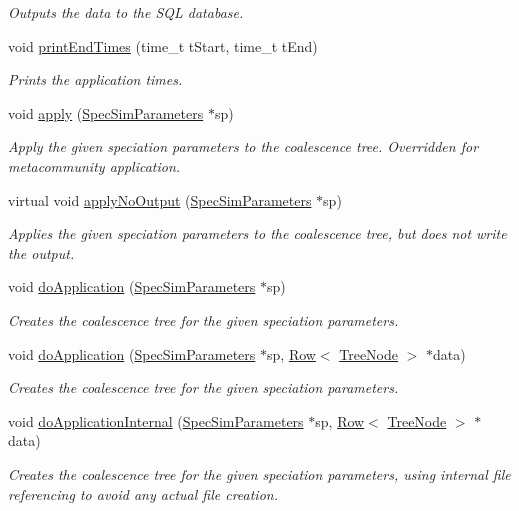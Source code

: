 \begin{DoxyCompactItemize}
\begin{DoxyCompactList}\small\item\em Outputs the data to the S\+QL database. \end{DoxyCompactList}\item 
void \hyperlink{class_community_a36216913433e3e011ee2420e83e1fe4a}{print\+End\+Times} (time\+\_\+t t\+Start, time\+\_\+t t\+End)
\begin{DoxyCompactList}\small\item\em Prints the application times. \end{DoxyCompactList}\item 
void \hyperlink{class_community_ac1dee14af27a0add712e257e316cadbf}{apply} (\hyperlink{struct_spec_sim_parameters}{Spec\+Sim\+Parameters} $\ast$sp)
\begin{DoxyCompactList}\small\item\em Apply the given speciation parameters to the coalescence tree. Overridden for metacommunity application. \end{DoxyCompactList}\item 
virtual void \hyperlink{class_community_ada966cf133c12d0cbabcd77784c951bb}{apply\+No\+Output} (\hyperlink{struct_spec_sim_parameters}{Spec\+Sim\+Parameters} $\ast$sp)
\begin{DoxyCompactList}\small\item\em Applies the given speciation parameters to the coalescence tree, but does not write the output. \end{DoxyCompactList}\item 
void \hyperlink{class_community_a8ce443a30731d2249852d2b615f4a29a}{do\+Application} (\hyperlink{struct_spec_sim_parameters}{Spec\+Sim\+Parameters} $\ast$sp)
\begin{DoxyCompactList}\small\item\em Creates the coalescence tree for the given speciation parameters. \end{DoxyCompactList}\item 
void \hyperlink{class_community_a7289dd39ee9b69ca314e1752a7b45701}{do\+Application} (\hyperlink{struct_spec_sim_parameters}{Spec\+Sim\+Parameters} $\ast$sp, \hyperlink{class_row}{Row}$<$ \hyperlink{class_tree_node}{Tree\+Node} $>$ $\ast$data)
\begin{DoxyCompactList}\small\item\em Creates the coalescence tree for the given speciation parameters. \end{DoxyCompactList}\item 
void \hyperlink{class_community_aee7488d02cccb897ed1d561e242391df}{do\+Application\+Internal} (\hyperlink{struct_spec_sim_parameters}{Spec\+Sim\+Parameters} $\ast$sp, \hyperlink{class_row}{Row}$<$ \hyperlink{class_tree_node}{Tree\+Node} $>$ $\ast$data)
\begin{DoxyCompactList}\small\item\em Creates the coalescence tree for the given speciation parameters, using internal file referencing to avoid any actual file creation. \end{DoxyCompactList}\end{DoxyCompactItemize}
